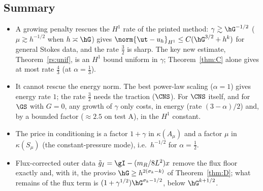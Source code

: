 \subsection{Summary}
\begin{itemize}
\item A growing penalty rescues the $H^1$ rate of the printed method: $\gamma\gtrsim\hG^{-1/2}$ ($\mu\gtrsim h^{-1/2}$ when $h\asymp\hG$) gives $\norm{\ut-u_h}_{H^1}\le C(\hG^{3/2}+h^k)$ for general Stokes data, and the rate $\frac32$ is sharp. The key new estimate, Theorem~\ref{rs:unif}, is an $H^1$ bound uniform in $\gamma$; Theorem~\ref{thm:C} alone gives at most rate $\frac43$ (at $\alpha=\frac13$).
\item It cannot rescue the energy norm. The best power-law scaling ($\alpha=1$) gives energy rate $1$; the rate $\frac32$ needs the traction ($\CNS$). For $\CNS$ itself, and for $\GS$ with $G=0$, any growth of $\gamma$ only costs, in energy (rate $(3-\alpha)/2$) and, by a bounded factor ($\approx2.5$ on test A), in the $H^1$ constant.
\item The price in conditioning is a factor $1+\gamma$ in $\kappa(A_\mu)$ and a factor $\mu$ in $\kappa(S_\mu)$ (the constant-pressure mode), i.e.\ $h^{-1/2}$ for $\alpha=\frac12$.
\item Flux-corrected outer data $\tilde g_I=\gI-(m_R/8L^2)x$ remove the flux floor exactly and, with it, the proviso $\hG\ge h^{2(\sigma_k-k)}$ of Theorem~\ref{thm:D}; what remains of the flux term is $(1+\gamma^{1/2})\hG^{\sigma_k-1/2}$, below $\hG^{k+1/2}$.
\end{itemize}
